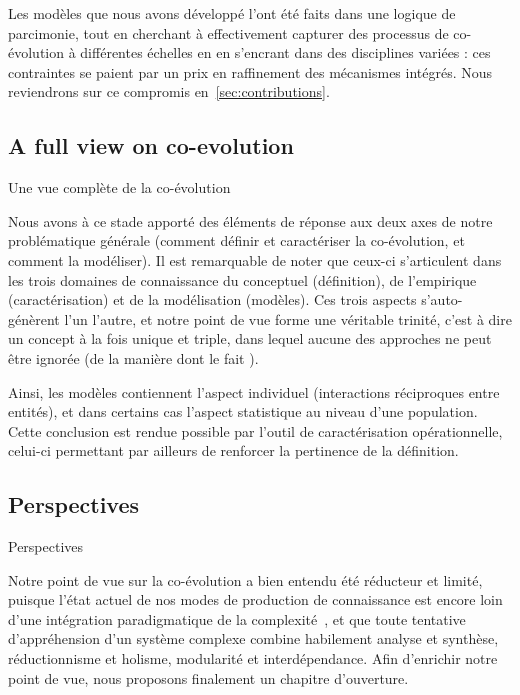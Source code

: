 Les modèles que nous avons développé l'ont été faits dans une logique de parcimonie, tout en cherchant à effectivement capturer des processus de co-évolution à différentes échelles en en s'encrant dans des disciplines variées : ces contraintes se paient par un prix en raffinement des mécanismes intégrés. Nous reviendrons sur ce compromis en~\ref{sec:contributions}.

\subsection*{A full view on co-evolution}{Une vue complète de la co-évolution}


Nous avons à ce stade apporté des éléments de réponse aux deux axes de notre problématique générale (comment définir et caractériser la co-évolution, et comment la modéliser). Il est remarquable de noter que ceux-ci s'articulent dans les trois domaines de connaissance du conceptuel (définition), de l'empirique (caractérisation) et de la modélisation (modèles). Ces trois aspects s'auto-génèrent l'un l'autre, et notre point de vue forme une véritable trinité, c'est à dire un concept à la fois unique et triple, dans lequel aucune des approches ne peut être ignorée (de la manière dont le fait \cite{morin2001methode}).

Ainsi, les modèles contiennent l'aspect individuel (interactions réciproques entre entités), et dans certains cas l'aspect statistique au niveau d'une population. Cette conclusion est rendue possible par l'outil de caractérisation opérationnelle, celui-ci permettant par ailleurs de renforcer la pertinence de la définition.




\subsection*{Perspectives}{Perspectives}

Notre point de vue sur la co-évolution a bien entendu été réducteur et limité, puisque l'état actuel de nos modes de production de connaissance est encore loin d'une intégration paradigmatique de la complexité~\cite{morin1991methode}, et que toute tentative d'appréhension d'un système complexe combine habilement analyse et synthèse, réductionnisme et holisme, modularité et interdépendance. Afin d'enrichir notre point de vue, nous proposons finalement un chapitre d'ouverture.








